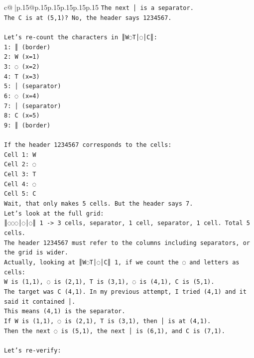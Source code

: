 \documentclass{article}
\begin{document}
{\begin{supertabular}{c@{$\;$}|p{.15\linewidth}@{}p{.15\linewidth}p{.15\linewidth}p{.15\linewidth}p{.15\linewidth}p{.15\linewidth}}
{{{\texttt{The next │ is a separator.} \\
\texttt{The C is at (5,1)? No, the header says 1234567.} \\
\\ 
\texttt{Let's re{-}count the characters in ║W◌T│◌│C║:} \\
\texttt{1: ║ (border)} \\
\texttt{2: W (x=1)} \\
\texttt{3: ◌ (x=2)} \\
\texttt{4: T (x=3)} \\
\texttt{5: │ (separator)} \\
\texttt{6: ◌ (x=4)} \\
\texttt{7: │ (separator)} \\
\texttt{8: C (x=5)} \\
\texttt{9: ║ (border)} \\
\\ 
\texttt{If the header 1234567 corresponds to the cells:} \\
\texttt{Cell 1: W} \\
\texttt{Cell 2: ◌} \\
\texttt{Cell 3: T} \\
\texttt{Cell 4: ◌} \\
\texttt{Cell 5: C} \\
\texttt{Wait, that only makes 5 cells. But the header says 7.} \\
\texttt{Let's look at the full grid:} \\
\texttt{║◌◌◌│◌│◌║ 1 {-}> 3 cells, separator, 1 cell, separator, 1 cell. Total 5 cells.} \\
\texttt{The header 1234567 must refer to the columns including separators, or the grid is wider.} \\
\texttt{Actually, looking at ║W◌T│◌│C║ 1, if we count the ◌ and letters as cells:} \\
\texttt{W is (1,1), ◌ is (2,1), T is (3,1), ◌ is (4,1), C is (5,1).} \\
\texttt{The target was C (4,1). In my previous attempt, I tried (4,1) and it said it contained │.} \\
\texttt{This means (4,1) is the separator.} \\
\texttt{If W is (1,1), ◌ is (2,1), T is (3,1), then │ is at (4,1).} \\
\texttt{Then the next ◌ is (5,1), the next │ is (6,1), and C is (7,1).} \\
\\ 
\texttt{Let's re{-}verify:} \\
}}}
\end{supertabular}}
\end{document}
